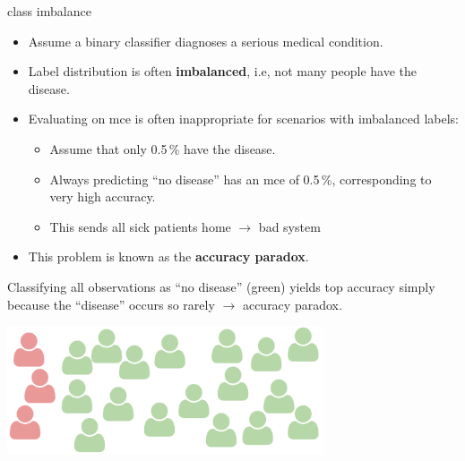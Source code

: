 \documentclass[11pt,compress,t,notes=noshow, xcolor=table]{beamer}
\begin{document}
\begin{vbframe}{class imbalance}

\begin{itemize}
 \item Assume a binary classifier diagnoses a serious medical
 condition.
 \item Label distribution is often \textbf{imbalanced}, i.e, not many
 people have the disease.
 \item Evaluating on mce is often inappropriate for scenarios with
 imbalanced labels:
 \begin{itemize}
   \item Assume that only 0.5\,\% have the disease.
   \item Always predicting \enquote{no disease} has an mce of 0.5\,\%,
   corresponding to very high accuracy.
   \item This sends all sick patients home $\rightarrow$ bad system %
 \end{itemize}
 \item This problem is known as the \textbf{accuracy paradox}.
\end{itemize}

\framebreak

Classifying all observations as \enquote{no disease} (green) yields top
accuracy simply because the \enquote{disease} occurs so rarely
$\rightarrow$ accuracy paradox.

\lz

\begin{center}
  \includegraphics[width=0.7\textwidth]{figure_man/imbalanced.pdf}
\end{center}

\end{vbframe}

\end{document}
